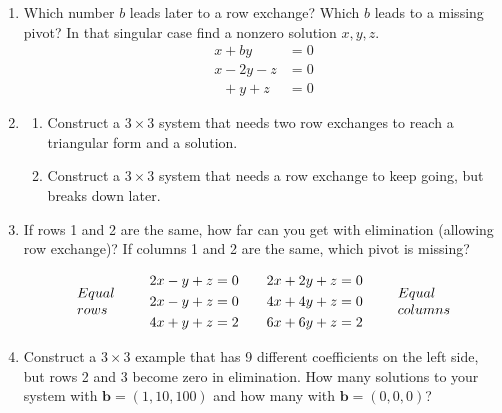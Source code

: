\documentclass[14pt, a4paper]{article}
\begin{document}
\begin{enumerate}[resume]
    \item Which number $b$ leads later to a row exchange? Which $b$ leads to a missing pivot? In that singular case find a nonzero solution $x, y, z$.
          \[
              \begin{aligned}
                  x + by \phantom{{}+z} & = 0 \\
                  x - 2y - z            & = 0 \\
                  \phantom{x} + y + z   & = 0
              \end{aligned}
          \]

    \item
          \begin{enumerate}
              \item Construct a $3 \times 3$ system that needs two row exchanges to reach a triangular form and a solution.
              \item Construct a $3 \times 3$ system that needs a row exchange to keep going, but breaks down later.
          \end{enumerate}

    \item If rows 1 and 2 are the same, how far can you get with elimination (allowing row exchange)? If columns 1 and 2 are the same, which pivot is missing?

          \[
              \begin{array}{l@{\qquad}c@{\qquad}c@{\qquad}c}
                  \begin{array}{l}
                      Equal \\
                      rows
                  \end{array}
                   &
                  \begin{aligned}
                      2x - y + z & = 0 \\
                      2x - y + z & = 0 \\
                      4x + y + z & = 2
                  \end{aligned}
                   &
                  \begin{aligned}
                      2x + 2y + z & = 0 \\
                      4x + 4y + z & = 0 \\
                      6x + 6y + z & = 2
                  \end{aligned}
                   &
                  \begin{array}{l}
                      Equal \\
                      columns
                  \end{array}
              \end{array}
          \]
    \item Construct a $3 \times 3$ example that has 9 different coefficients on the left side, but rows 2 and 3 become zero in elimination. How many solutions to your system with $\boldsymbol{b} = (1,10,100)$ and how many with $\boldsymbol{b} = (0,0,0)$?


\end{enumerate}
\end{document}
